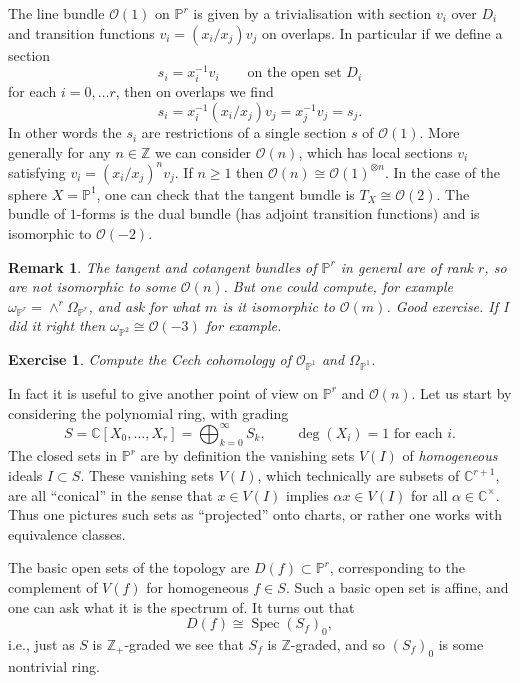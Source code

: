 \documentclass[12pt]{article}
\theoremstyle{plain}
\newtheorem{rem}[thm]{Remark}
\newtheorem{exer}[thm]{Exercise}
\theoremstyle{definition}
\numberwithin{equation}{section}
\DeclareMathOperator{\spec}{Spec}
\newcommand{\al}{\alpha}
\newcommand{\Om}{\Omega}
\newcommand{\C}{\mathbb{C}}
\newcommand{\Z}{\mathbb{Z}}
\newcommand{\bbP}{\mathbb{P}}
\newcommand{\OO}{\mathcal{O}}
\begin{document}
The line bundle $\OO(1)$ on $\bbP^r$ is given by a trivialisation with section $v_i$ over $D_i$ and transition functions $v_i = (x_i/x_j) v_j$ on overlaps. In particular if we define a section
\[
s_i = x_i^{-1} v_i \qquad \text{on the open set $D_i$}
\]
for each $i = 0, \ldots r$, then on overlaps we find
\[
s_i = x_i^{-1} (x_i/x_j) v_j = x_j^{-1} v_j = s_j.
\]
In other words the $s_i$ are restrictions of a single section $s$ of $\OO(1)$. More generally for any $n \in \Z$ we can consider $\OO(n)$, which has local sections $v_i$ satisfying $v_i = (x_i/x_j)^n v_j$. If $n \geq 1$ then $\OO(n) \cong \OO(1)^{\otimes n}$. In the case of the sphere $X = \bbP^1$, one can check that the tangent bundle is $T_X \cong \OO(2)$. The bundle of $1$-forms is the dual bundle (has adjoint transition functions) and is isomorphic to $\OO(-2)$.
\begin{rem}
The tangent and cotangent bundles of $\bbP^r$ in general are of rank $r$, so are not isomorphic to some $\OO(n)$. But one could compute, for example $\omega_{\bbP^r} = \wedge^r \Om_{\bbP^r}$, and ask for what $m$ is it isomorphic to $\OO(m)$. Good exercise. If I did it right then $\omega_{\bbP^2} \cong \OO(-3)$ for example.
\end{rem}

\begin{exer}
Compute the Cech cohomology of $\OO_{\bbP^1}$ and $\Omega_{\bbP^1}$.
\end{exer}

In fact it is useful to give another point of view on $\bbP^r$ and $\OO(n)$. Let us start by considering the polynomial ring, with grading
\[
S = \C[X_0, \ldots, X_r] = \bigoplus_{k=0}^\infty S_k, \qquad \text{$\deg(X_i) = 1$ for each $i$}.
\]
The closed sets in $\bbP^r$ are by definition the vanishing sets $V(I)$ of \emph{homogeneous} ideals $I \subset S$. These vanishing sets $V(I)$, which technically are subsets of $\C^{r+1}$, are all ``conical'' in the sense that $x \in V(I)$ implies $\alpha x \in V(I)$ for all $\al \in \C^{\times}$. Thus one pictures such sets as ``projected'' onto charts, or rather one works with equivalence classes.

The basic open sets of the topology are $D(f) \subset \bbP^r$, corresponding to the complement of $V(f)$ for homogeneous $f \in S$. Such a basic open set is affine, and one can ask what it is the spectrum of. It turns out that
\[
D(f) \cong \spec(S_f)_0,
\]
i.e., just as $S$ is $\Z_+$-graded we see that $S_f$ is $\Z$-graded, and so $(S_f)_0$ is some nontrivial ring.
\end{document}
